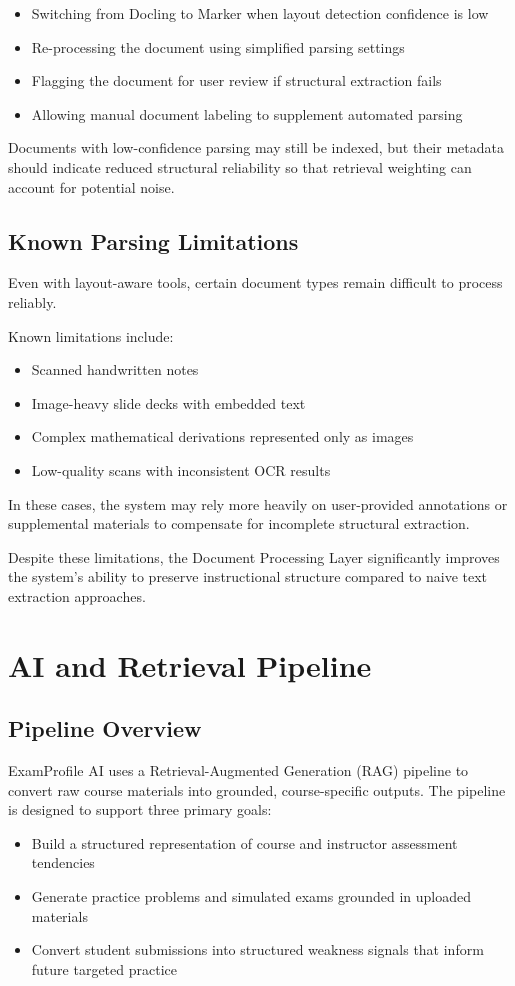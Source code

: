 \documentclass[11pt]{article}
\begin{document}
\begin{itemize}
\item Switching from Docling to Marker when layout detection confidence is low
\item Re-processing the document using simplified parsing settings
\item Flagging the document for user review if structural extraction fails
\item Allowing manual document labeling to supplement automated parsing
\end{itemize}

Documents with low-confidence parsing may still be indexed, but their metadata should indicate reduced structural reliability so that retrieval weighting can account for potential noise.

\subsection{Known Parsing Limitations}
Even with layout-aware tools, certain document types remain difficult to process reliably.

Known limitations include:

\begin{itemize}
\item Scanned handwritten notes
\item Image-heavy slide decks with embedded text
\item Complex mathematical derivations represented only as images
\item Low-quality scans with inconsistent OCR results
\end{itemize}

In these cases, the system may rely more heavily on user-provided annotations or supplemental materials to compensate for incomplete structural extraction.

Despite these limitations, the Document Processing Layer significantly improves the system's ability to preserve instructional structure compared to naive text extraction approaches.

\section{AI and Retrieval Pipeline}

\subsection{Pipeline Overview}
ExamProfile AI uses a Retrieval-Augmented Generation (RAG) pipeline to convert raw course materials into grounded, course-specific outputs. The pipeline is designed to support three primary goals:
\begin{itemize}
\item Build a structured representation of course and instructor assessment tendencies
\item Generate practice problems and simulated exams grounded in uploaded materials
\item Convert student submissions into structured weakness signals that inform future targeted practice
\end{itemize}
\end{document}
